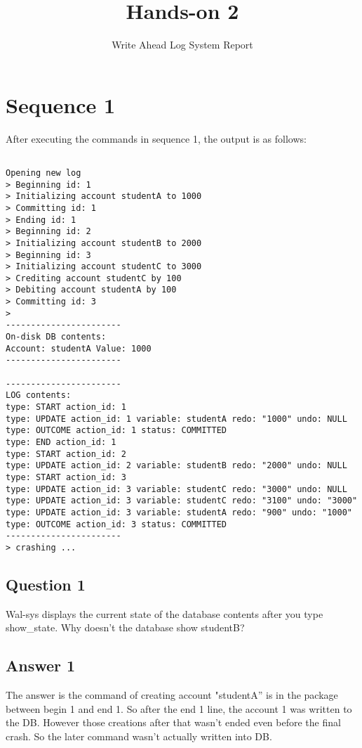 \documentclass[12pt]{article}
\title{Hands-on 2}
\author{Write Ahead Log System Report}
\date{}                                           %
\begin{document}
\maketitle

\section*{Sequence 1}

After executing the commands in sequence 1, the output is as follows:

\begin{lstlisting}[numberstyle=\tiny\monaco,
        basicstyle=\small\monaco]
        
Opening new log
> Beginning id: 1
> Initializing account studentA to 1000
> Committing id: 1
> Ending id: 1
> Beginning id: 2
> Initializing account studentB to 2000
> Beginning id: 3
> Initializing account studentC to 3000
> Crediting account studentC by 100
> Debiting account studentA by 100
> Committing id: 3
> 
-----------------------
On-disk DB contents:
Account: studentA Value: 1000
-----------------------

-----------------------
LOG contents:
type: START action_id: 1
type: UPDATE action_id: 1 variable: studentA redo: "1000" undo: NULL
type: OUTCOME action_id: 1 status: COMMITTED
type: END action_id: 1
type: START action_id: 2
type: UPDATE action_id: 2 variable: studentB redo: "2000" undo: NULL
type: START action_id: 3
type: UPDATE action_id: 3 variable: studentC redo: "3000" undo: NULL
type: UPDATE action_id: 3 variable: studentC redo: "3100" undo: "3000"
type: UPDATE action_id: 3 variable: studentA redo: "900" undo: "1000"
type: OUTCOME action_id: 3 status: COMMITTED
-----------------------
> crashing ...
\end{lstlisting}

\subsection*{Question 1} Wal-sys displays the current state of the database contents after you type show\_state. Why doesn't the database show studentB?

\subsection*{Answer 1} The answer is the command of creating account "studentA'' is in the package between begin 1 and end 1. So after the end 1 line, the account 1 was written to the DB. However those creations after that wasn't ended even before the final crash. So the later command wasn't actually written into DB.
\end{document}
